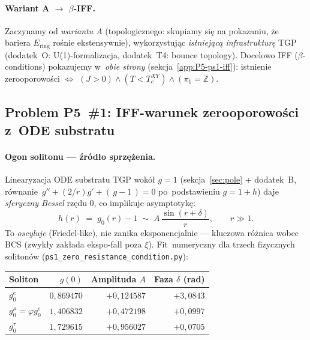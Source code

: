 \paragraph{Wariant A $\to$ $\beta$-IFF.}
Zaczynamy od \emph{wariantu A} (topologicznego: skupiamy si\k{e} na
pokazaniu, \.ze bariera $E_\text{ring}$ ro\'snie ekstensywnie),
wykorzystuj\k{a}c \emph{istniej\k{a}c\k{a} infrastruktur\k{e}} TGP
(dodatek~O: U(1)-formalizacja, dodatek~T4: bounce topology).
Docelowo IFF ($\beta$-conditions) pokazujemy w~\emph{obie strony}
(sekcja~\ref{app:P5-ps1-iff}): istnienie zerooporowo\'sci $\Leftrightarrow$
$(J{>}0)\land(T{<}T_c^{XY})\land(\pi_1{=}\mathbb{Z})$.

\subsection{Problem P5~\#1: IFF-warunek zerooporowo\'sci z~ODE substratu}%
\label{app:P5-ps1}

\paragraph{Ogon solitonu --- źródło sprz\k{e}żenia.}
Linearyzacja ODE substratu TGP wok\'o\l{} $g=1$
(sekcja~\ref{sec:pole} + dodatek~B, r\'ow\-na\-nie~$g''+(2/r)g'+(\,g-1\,)=0$
po~podstawieniu $g=1+h$) daje \emph{sferyczny Bessel} rz\k{e}du 0,
co implikuje asymptotyk\k{e}:
\begin{equation}
\label{eq:P5-tail}
  h(r) \;=\; g_0(r) - 1 \;\sim\; A\,\frac{\sin(r+\delta)}{r},\qquad
  r\gg 1.
\end{equation}
To \emph{oscyluje} (Friedel-like), nie zanika eksponencjalnie ---
kluczowa r\'o\.znica wobec BCS (zwyk\l{}y zak\l{}ada ekspo-fall
poza $\xi$). Fit~numeryczny dla trzech fizycznych solitonów
(\texttt{ps1\_zero\_resistance\_condition.py}):

\begin{center}\footnotesize
\begin{tabular}{@{}lrrr@{}}
\toprule
Soliton & $g(0)$ & Amplituda $A$ & Faza $\delta$ (rad) \\
\midrule
$g_0^e$   & $0{,}869470$ & $+0{,}124587$ & $+3{,}0843$ \\
$g_0^\mu = \varphi g_0^e$ & $1{,}406832$ & $+0{,}472198$ & $+0{,}0997$ \\
$g_0^\tau$ & $1{,}729615$ & $+0{,}956027$ & $+0{,}0705$ \\
\bottomrule
\end{tabular}
\end{center}

